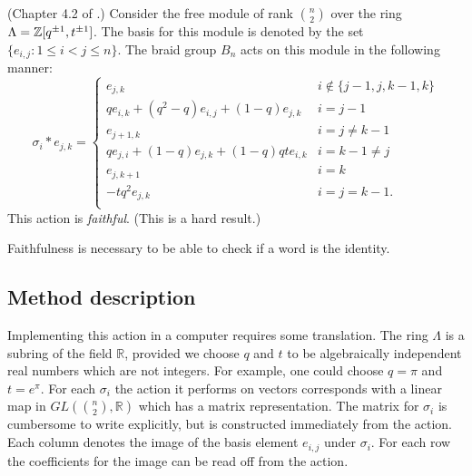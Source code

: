 \documentclass[12pt]{thesis}
\begin{document}
\begin{proposition}
    (Chapter 4.2 of \cite{lk-representation}.)
Consider the  free module of rank ${n \choose 2}$
over the ring $\Lambda = \mathbb{Z}[q^{\pm 1}, t^{\pm 1}]$.
The basis for this module is denoted by the set $\{ e_{i, j} \colon 1 \leq i < j \leq n \}$.
The braid group $B_{n}$ acts on this module in the following manner:
\[
    \sigma_{i} * e_{j, k} =
    \begin{cases}
        e_{j, k} & i \not\in \{ j -1, j, k -1, k \} \\
        qe_{i, k} + (q^{2} - q)e_{i, j} + (1-q)e_{j, k} & i = j -1 \\
        e_{j + 1, k} & i = j \neq k -1 \\
        qe_{j, i} + (1 - q) e_{j, k} + (1 - q)qte_{i, k} & i = k - 1 \neq j \\
        e_{j, k +1} & i = k \\
        -tq^{2} e_{j, k} & i = j = k - 1. \\
    \end{cases}
\]
This action is \textit{faithful}. (This is a hard result.)
\end{proposition}

Faithfulness is necessary to be able
to check if a word is the identity.

\subsection{Method description}

Implementing this action in a computer requires some translation.
The ring $\Lambda$ is a subring of the field $\mathbb{R}$,
provided we choose $q$ and $t$ to be algebraically independent
real numbers which are not integers.
For example, one could choose $q = \pi$ and $t = e^{\pi}$.
For each $\sigma_{i}$ the action it performs on vectors corresponds with a linear map
in $GL({ n \choose 2}, \mathbb{R})$ which has a matrix representation.
The matrix for $\sigma_{i}$ is cumbersome to write explicitly, but is
constructed immediately from the action.
Each column denotes the image of the basis element $e_{i, j}$ under $\sigma_{i}$.
For each row the coefficients for the image
can be read off from the action.
\end{document}
